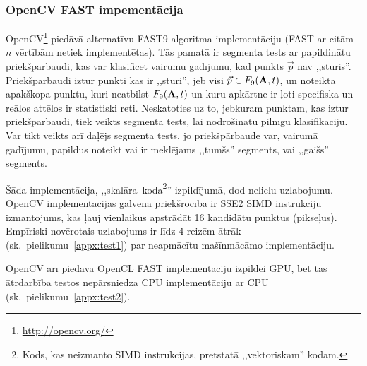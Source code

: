 \subsubsection{OpenCV FAST impementācija} \label{sec:fast-ocv}
OpenCV\footnote{\url{http://opencv.org/}} piedāvā alternatīvu FAST9 algoritma
implementāciju (FAST ar citām $n$ vērtībām netiek implementētas).
Tās pamatā ir segmenta tests ar papildinātu
priekšpārbaudi\cite{Rosten-tracking}\cite{FAST}, kas var klasificēt vairumu
gadījumu, kad punkts $\vec{p}$ nav ,,stūris''. Priekšpārbaudi iztur
punkti kas ir ,,stūri'', jeb visi $\vec{p} \in F_9(\mathbf{A}, t)$,
un noteikta apakškopa punktu, kuri neatbilst $F_9(\mathbf{A}, t)$ un kuru
apkārtne ir ļoti specifiska un reālos attēlos ir statistiski reti.
Neskatoties
uz to, jebkuram punktam, kas iztur priekšpārbaudi, tiek veikts segmenta
tests, lai nodrošinātu pilnīgu klasifikāciju.
Var tikt veikts arī daļējs segmenta tests, jo priekšpārbaude var,
vairumā gadījumu, papildus noteikt vai ir meklējams ,,tumšs'' segments, vai
,,gaišs'' segments.

Šāda implementācija, ,,skalāra~koda\footnote{Kods, kas neizmanto SIMD
	instrukcijas, pretstatā ,,vektoriskam'' kodam.}''
izpildījumā, dod nelielu uzlabojumu. OpenCV implementācijas galvenā
priekšrocība ir SSE2 SIMD instrukciju izmantojums, kas ļauj vienlaikus
apstrādāt 16 kandidātu punktus (pikseļus). Empīriski novērotais
uzlabojums ir līdz 4 reizēm ātrāk (sk.~pielikumu~\ref{appx:test1})
par neapmācītu mašīnmācāmo implementāciju.

OpenCV arī piedāvā OpenCL FAST implementāciju izpildei GPU, bet tās
ātrdarbība testos nepārsniedza CPU implementāciju ar CPU
(sk.~pielikumu~\ref{appx:test2}).
